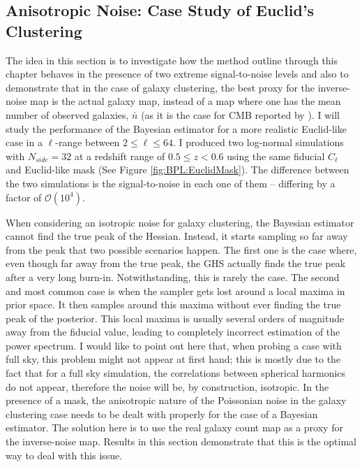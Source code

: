 \subsection{Anisotropic Noise: Case Study of Euclid's Clustering}\label{Sec:Noise}
The idea in this section is to investigate how the method outline through this chapter behaves in the presence of two extreme signal-to-noise levels and also to demonstrate that in the case of galaxy clustering, the best proxy for the inverse-noise map is the actual galaxy map, instead of a map where one has the mean number of observed galaxies, $\bar{n}$ (as it is the case for CMB reported by \cite{SreeThesis}). I will study the performance of the Bayesian estimator for a more realistic Euclid-like case in a $\ell$-range between $2 \leq \ell \leq 64$. I produced two log-normal simulations with $N_{side}=32$ at a redshift range of $0.5 \leq z < 0.6$ using the same fiducial $C_{\ell}$ and Euclid-like mask (See Figure \ref{fig:BPL:EuclidMask}). The difference between the two simulations is the signal-to-noise in each one of them -- differing by a factor of $\mathcal{O}(10^4)$. 

\qquad When considering an isotropic noise for galaxy clustering, the Bayesian estimator cannot find the true peak of the Hessian. Instead, it starts sampling so far away from the peak that two possible scenarios happen. The first one is the case where, even though far away from the true peak, the GHS actually finds the true peak after a very long burn-in. Notwithstanding, this is rarely the case. The second and most common case is when the sampler gets lost around a local maxima in prior space. It then samples around this maxima without ever finding the true peak of the posterior. This local maxima is usually several orders of magnitude away from the fiducial value, leading to completely incorrect estimation of the power spectrum. I would like to point out here that, when probing a case with full sky, this problem might not appear at first hand; this is mostly due to the fact that for a full sky simulation, the correlations between spherical harmonics do not appear, therefore the noise will be, by construction, isotropic. In the presence of a mask, the anisotropic nature of the Poissonian noise in the galaxy clustering case needs to be dealt with properly for the case of a Bayesian estimator. The solution here is to use the real galaxy count map as a proxy for the inverse-noise map. Results in this section demonstrate that this is the optimal way to deal with this issue.

